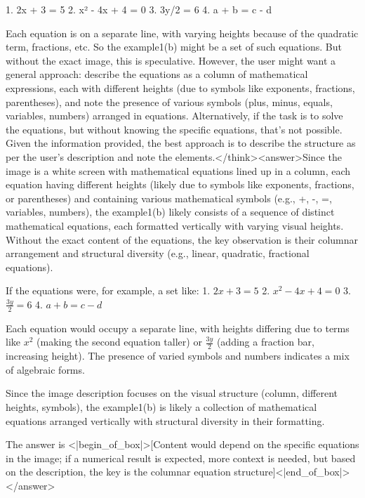1. 2x + 3 = 5
2. x² - 4x + 4 = 0
3. 3y/2 = 6
4. a + b = c - d

Each equation is on a separate line, with varying heights because of the quadratic term, fractions, etc. So the example1(b) might be a set of such equations. But without the exact image, this is speculative. However, the user might want a general approach: describe the equations as a column of mathematical expressions, each with different heights (due to symbols like exponents, fractions, parentheses), and note the presence of various symbols (plus, minus, equals, variables, numbers) arranged in equations. Alternatively, if the task is to solve the equations, but without knowing the specific equations, that's not possible. Given the information provided, the best approach is to describe the structure as per the user's description and note the elements.</think><answer>Since the image is a white screen with mathematical equations lined up in a column, each equation having different heights (likely due to symbols like exponents, fractions, or parentheses) and containing various mathematical symbols (e.g., +, -, =, variables, numbers), the example1(b) likely consists of a sequence of distinct mathematical equations, each formatted vertically with varying visual heights. Without the exact content of the equations, the key observation is their columnar arrangement and structural diversity (e.g., linear, quadratic, fractional equations).  

If the equations were, for example, a set like:  
1. \( 2x + 3 = 5 \)  
2. \( x^2 - 4x + 4 = 0 \)  
3. \( \frac{3y}{2} = 6 \)  
4. \( a + b = c - d \)  

Each equation would occupy a separate line, with heights differing due to terms like \( x^2 \) (making the second equation taller) or \( \frac{3y}{2} \) (adding a fraction bar, increasing height). The presence of varied symbols and numbers indicates a mix of algebraic forms.  

Since the image description focuses on the visual structure (column, different heights, symbols), the example1(b) is likely a collection of mathematical equations arranged vertically with structural diversity in their formatting.  

The answer is <|begin_of_box|>[Content would depend on the specific equations in the image; if a numerical result is expected, more context is needed, but based on the description, the key is the columnar equation structure]<|end_of_box|></answer>